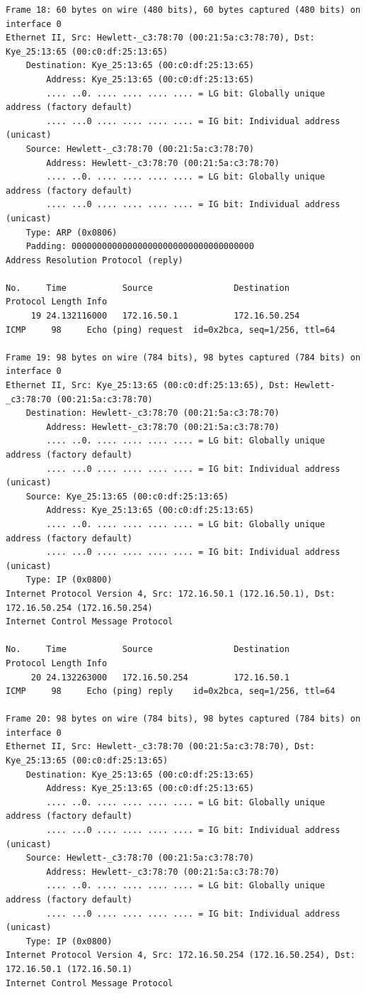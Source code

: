 \documentclass[a4paper,11pt]{article}
\begin{document}
\begin{lstlisting}
Frame 18: 60 bytes on wire (480 bits), 60 bytes captured (480 bits) on interface 0
Ethernet II, Src: Hewlett-_c3:78:70 (00:21:5a:c3:78:70), Dst: Kye_25:13:65 (00:c0:df:25:13:65)
    Destination: Kye_25:13:65 (00:c0:df:25:13:65)
        Address: Kye_25:13:65 (00:c0:df:25:13:65)
        .... ..0. .... .... .... .... = LG bit: Globally unique address (factory default)
        .... ...0 .... .... .... .... = IG bit: Individual address (unicast)
    Source: Hewlett-_c3:78:70 (00:21:5a:c3:78:70)
        Address: Hewlett-_c3:78:70 (00:21:5a:c3:78:70)
        .... ..0. .... .... .... .... = LG bit: Globally unique address (factory default)
        .... ...0 .... .... .... .... = IG bit: Individual address (unicast)
    Type: ARP (0x0806)
    Padding: 000000000000000000000000000000000000
Address Resolution Protocol (reply)

No.     Time           Source                Destination           Protocol Length Info
     19 24.132116000   172.16.50.1           172.16.50.254         ICMP     98     Echo (ping) request  id=0x2bca, seq=1/256, ttl=64

Frame 19: 98 bytes on wire (784 bits), 98 bytes captured (784 bits) on interface 0
Ethernet II, Src: Kye_25:13:65 (00:c0:df:25:13:65), Dst: Hewlett-_c3:78:70 (00:21:5a:c3:78:70)
    Destination: Hewlett-_c3:78:70 (00:21:5a:c3:78:70)
        Address: Hewlett-_c3:78:70 (00:21:5a:c3:78:70)
        .... ..0. .... .... .... .... = LG bit: Globally unique address (factory default)
        .... ...0 .... .... .... .... = IG bit: Individual address (unicast)
    Source: Kye_25:13:65 (00:c0:df:25:13:65)
        Address: Kye_25:13:65 (00:c0:df:25:13:65)
        .... ..0. .... .... .... .... = LG bit: Globally unique address (factory default)
        .... ...0 .... .... .... .... = IG bit: Individual address (unicast)
    Type: IP (0x0800)
Internet Protocol Version 4, Src: 172.16.50.1 (172.16.50.1), Dst: 172.16.50.254 (172.16.50.254)
Internet Control Message Protocol

No.     Time           Source                Destination           Protocol Length Info
     20 24.132263000   172.16.50.254         172.16.50.1           ICMP     98     Echo (ping) reply    id=0x2bca, seq=1/256, ttl=64

Frame 20: 98 bytes on wire (784 bits), 98 bytes captured (784 bits) on interface 0
Ethernet II, Src: Hewlett-_c3:78:70 (00:21:5a:c3:78:70), Dst: Kye_25:13:65 (00:c0:df:25:13:65)
    Destination: Kye_25:13:65 (00:c0:df:25:13:65)
        Address: Kye_25:13:65 (00:c0:df:25:13:65)
        .... ..0. .... .... .... .... = LG bit: Globally unique address (factory default)
        .... ...0 .... .... .... .... = IG bit: Individual address (unicast)
    Source: Hewlett-_c3:78:70 (00:21:5a:c3:78:70)
        Address: Hewlett-_c3:78:70 (00:21:5a:c3:78:70)
        .... ..0. .... .... .... .... = LG bit: Globally unique address (factory default)
        .... ...0 .... .... .... .... = IG bit: Individual address (unicast)
    Type: IP (0x0800)
Internet Protocol Version 4, Src: 172.16.50.254 (172.16.50.254), Dst: 172.16.50.1 (172.16.50.1)
Internet Control Message Protocol


\end{lstlisting}
\end{document}
